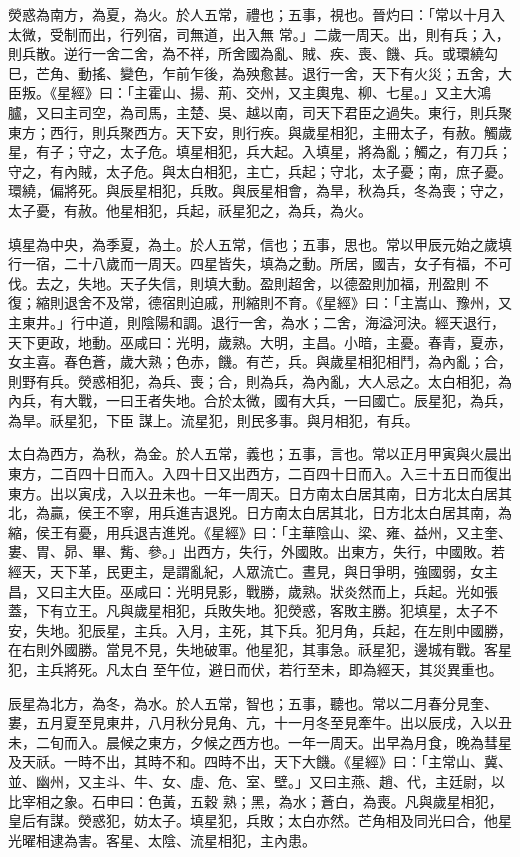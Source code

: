 \begin{pinyinscope}
 熒惑為南方，為夏，為火。於人五常，禮也；五事，視也。晉灼曰：「常以十月入太微，受制而出，行列宿，司無道，出入無
 常。」二歲一周天。出，則有兵；入，則兵散。逆行一舍二舍，為不祥，所舍國為亂、賊、疾、喪、饑、兵。或環繞勾巳，芒角、動搖、變色，乍前乍後，為殃愈甚。退行一舍，天下有火災；五舍，大臣叛。《星經》曰：「主霍山、揚、荊、交州，又主輿鬼、柳、七星。」又主大鴻臚，又曰主司空，為司馬，主楚、吳、越以南，司天下君臣之過失。東行，則兵聚東方；西行，則兵聚西方。天下安，則行疾。與歲星相犯，主冊太子，有赦。觸歲星，有子；守之，太子危。填星相犯，兵大起。入填星，將為亂；觸之，有刀兵；
 守之，有內賊，太子危。與太白相犯，主亡，兵起；守北，太子憂；南，庶子憂。環繞，偏將死。與辰星相犯，兵敗。與辰星相會，為旱，秋為兵，冬為喪；守之，太子憂，有赦。他星相犯，兵起，祅星犯之，為兵，為火。



 填星為中央，為季夏，為土。於人五常，信也；五事，思也。常以甲辰元始之歲填行一宿，二十八歲而一周天。四星皆失，填為之動。所居，國吉，女子有福，不可伐。去之，失地。天子失信，則填大動。盈則超舍，以德盈則加福，刑盈則
 不復；縮則退舍不及常，德宿則迫戚，刑縮則不育。《星經》曰：「主嵩山、豫州，又主東井。」行中道，則陰陽和調。退行一舍，為水；二舍，海溢河決。經天退行，天下更政，地動。巫咸曰：光明，歲熟。大明，主昌。小暗，主憂。春青，夏赤，女主喜。春色蒼，歲大熟；色赤，饑。有芒，兵。與歲星相犯相鬥，為內亂；合，則野有兵。熒惑相犯，為兵、喪；合，則為兵，為內亂，大人忌之。太白相犯，為內兵，有大戰，一曰王者失地。合於太微，國有大兵，一曰國亡。辰星犯，為兵，為旱。祅星犯，下臣
 謀上。流星犯，則民多事。與月相犯，有兵。



 太白為西方，為秋，為金。於人五常，義也；五事，言也。常以正月甲寅與火晨出東方，二百四十日而入。入四十日又出西方，二百四十日而入。入三十五日而復出東方。出以寅戌，入以丑未也。一年一周天。日方南太白居其南，日方北太白居其北，為贏，侯王不寧，用兵進吉退兇。日方南太白居其北，日方北太白居其南，為縮，侯王有憂，用兵退吉進兇。《星經》曰：「主華陰山、梁、雍、益州，又主奎、
 婁、胃、昴、畢、觜、參。」出西方，失行，外國敗。出東方，失行，中國敗。若經天，天下革，民更主，是謂亂紀，人眾流亡。晝見，與日爭明，強國弱，女主昌，又曰主大臣。巫咸曰：光明見影，戰勝，歲熟。狀炎然而上，兵起。光如張蓋，下有立王。凡與歲星相犯，兵敗失地。犯熒惑，客敗主勝。犯填星，太子不安，失地。犯辰星，主兵。入月，主死，其下兵。犯月角，兵起，在左則中國勝，在右則外國勝。當見不見，失地破軍。他星犯，其事急。祅星犯，邊城有戰。客星犯，主兵將死。凡太白
 至午位，避日而伏，若行至未，即為經天，其災異重也。



 辰星為北方，為冬，為水。於人五常，智也；五事，聽也。常以二月春分見奎、婁，五月夏至見東井，八月秋分見角、亢，十一月冬至見牽牛。出以辰戌，入以丑未，二旬而入。晨候之東方，夕候之西方也。一年一周天。出早為月食，晚為彗星及天祅。一時不出，其時不和。四時不出，天下大饑。《星經》曰：「主常山、冀、並、幽州，又主斗、牛、女、虛、危、室、壁。」又曰主燕、趙、代，主廷尉，以比宰相之象。石申曰：色黃，五穀
 熟；黑，為水；蒼白，為喪。凡與歲星相犯，皇后有謀。熒惑犯，妨太子。填星犯，兵敗；太白亦然。芒角相及同光曰合，他星光曜相逮為害。客星、太陰、流星相犯，主內患。




\end{pinyinscope}
